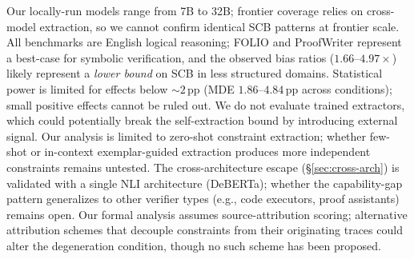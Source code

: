  Our locally-run models range from 7B to 32B; frontier coverage relies on cross-model extraction, so we cannot confirm identical SCB patterns at frontier scale. All benchmarks are English logical reasoning; FOLIO and ProofWriter represent a best-case for symbolic verification, and the observed bias ratios ($1.66$--$4.97\times$) likely represent a \emph{lower bound} on SCB in less structured domains. Statistical power is limited for effects below ${\sim}2$\,pp (MDE $1.86$--$4.84$\,pp across conditions); small positive effects cannot be ruled out. We do not evaluate trained extractors, which could potentially break the self-extraction bound by introducing external signal. Our analysis is limited to zero-shot constraint extraction; whether few-shot or in-context exemplar-guided extraction produces more independent constraints remains untested. The cross-architecture escape (\S\ref{sec:cross-arch}) is validated with a single NLI architecture (DeBERTa); whether the capability-gap pattern generalizes to other verifier types (e.g., code executors, proof assistants) remains open. Our formal analysis assumes source-attribution scoring; alternative attribution schemes that decouple constraints from their originating traces could alter the degeneration condition, though no such scheme has been proposed.
